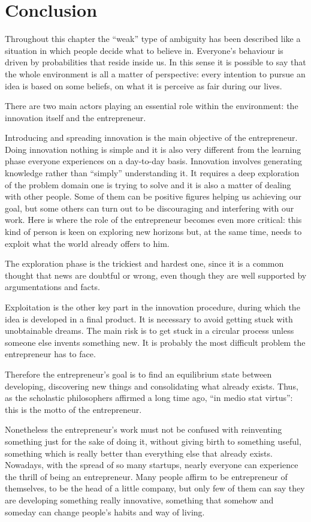 \section{Conclusion}
Throughout this chapter the “weak” type of ambiguity has been described like a situation in which people decide what to believe in. Everyone’s behaviour is driven by probabilities that reside inside us. In this sense it is possible to say that the whole environment is all a matter of perspective: every intention to pursue an idea is based on some beliefs, on what it is perceive as fair during our lives.

There are two main actors playing an essential role within the environment: the innovation itself and the entrepreneur.

Introducing and spreading innovation is the main objective of the entrepreneur. Doing innovation nothing is simple and it is also very different from the learning phase everyone experiences on a day-to-day basis. Innovation involves generating knowledge rather than “simply” understanding it. It requires a deep exploration of the problem domain one is trying to solve and it is also a matter of dealing with other people. Some of them can be positive figures helping us achieving our goal, but some others can turn out to be discouraging and interfering with our work.
Here is where the role of the entrepreneur becomes even more critical: this kind of person is keen on exploring new horizons but, at the same time, needs to exploit what the world already offers to him.

The exploration phase is the trickiest and hardest one, since it is a common thought that news are doubtful or wrong, even though they are well supported by argumentations and facts.

Exploitation is the other key part in the innovation procedure, during which the idea is developed in a final product. It is necessary to avoid getting stuck with unobtainable dreams. The main risk is to get stuck in a circular process unless someone else invents something new. It is probably the most difficult problem the entrepreneur has to face.

Therefore the entrepreneur’s goal is to find an equilibrium state between developing, discovering new things and consolidating what already exists. Thus, as the scholastic philosophers affirmed a long time ago, “in medio stat virtus”: this is the motto of the entrepreneur.

Nonetheless the entrepreneur’s work must not be confused with reinventing something just for the sake of doing it, without giving birth to something useful, something which is really better than everything else that already exists. Nowadays, with the spread of so many startups, nearly everyone can experience the thrill of being an entrepreneur. Many people affirm to be entrepreneur of themselves, to be the head of a little company, but only few of them can say  they are developing something really innovative, something that somehow and someday can change people's habits and way of living.

